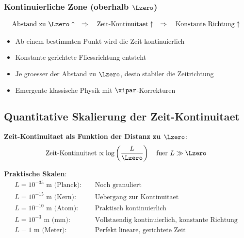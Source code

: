 	\subsubsection{Kontinuierliche Zone (oberhalb $\Lzero$)}
	
	\begin{tcolorbox}[colback=blue!5!white,colframe=blue!75!black,title=Zentrale Erkenntnis]
		\begin{equation}
			\text{Abstand zu } \Lzero \uparrow \quad \Rightarrow \quad \text{Zeit-Kontinuitaet} \uparrow \quad \Rightarrow \quad \text{Konstante Richtung} \uparrow
		\end{equation}
	\end{tcolorbox}
	
	\begin{itemize}
		\item Ab einem bestimmten Punkt wird die Zeit kontinuierlich
		\item Konstante gerichtete Fliessrichtung entsteht
		\item Je groesser der Abstand zu $\Lzero$, desto stabiler die Zeitrichtung
		\item Emergente klassische Physik mit $\xipar$-Korrekturen
	\end{itemize}
	
	\subsection{Quantitative Skalierung der Zeit-Kontinuitaet}
	
	\textbf{Zeit-Kontinuitaet als Funktion der Distanz zu $\Lzero$}:
	\begin{equation}
		\text{Zeit-Kontinuitaet} \propto \log\left(\frac{L}{\Lzero}\right) \quad \text{fuer } L \gg \Lzero
	\end{equation}
	
	\textbf{Praktische Skalen}:
	\begin{align}
		L = 10^{-35}\text{ m (Planck)}: &\quad \text{Noch granuliert} \\
		L = 10^{-15}\text{ m (Kern)}: &\quad \text{Uebergang zur Kontinuitaet} \\
		L = 10^{-10}\text{ m (Atom)}: &\quad \text{Praktisch kontinuierlich} \\
		L = 10^{-3}\text{ m (mm)}: &\quad \text{Vollstaendig kontinuierlich, konstante Richtung} \\
		L = 1\text{ m (Meter)}: &\quad \text{Perfekt lineare, gerichtete Zeit}
	\end{align}
	
